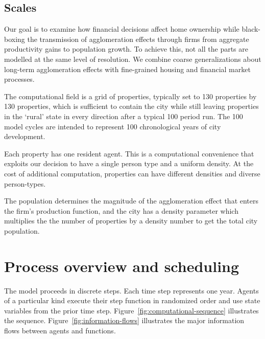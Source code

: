                 
\subsection{Scales}
Our goal is to examine %
how financial decisions affect home ownership while black-boxing the transmission of agglomeration effects through firms from aggregate productivity gains to population growth.  To achieve this, not all the parts are modelled at the same level of resolution. We combine coarse generalizations about long-term agglomeration effects with fine-grained housing and financial market processes. 

The computational field is a grid of properties, typically set to 130 properties by 130 properties, which is sufficient to contain the city while still leaving properties in the `rural' state in every direction after a typical 100 period run. The 100 model cycles are intended to represent 100 chronological years of city development. %

Each property has one resident agent. This is a computational convenience that exploits our decision to have a single person type and a uniform density. At the cost of additional computation, properties can have different densities and diverse person-types.

The population determines the magnitude of the agglomeration effect that enters the firm's production function, and the city has a density parameter which multiplies the the number of properties by a density number to get the total city population. 






\section{Process overview and scheduling}

The model proceeds in discrete steps. Each time step represents one year. Agents of a particular kind execute their step function in randomized order and use state variables from the prior time step. Figure~\ref{fig:computational-sequence} illustrates the sequence. Figure~\ref{fig:information-flows} illustrates the major information flows between agents and functions.

